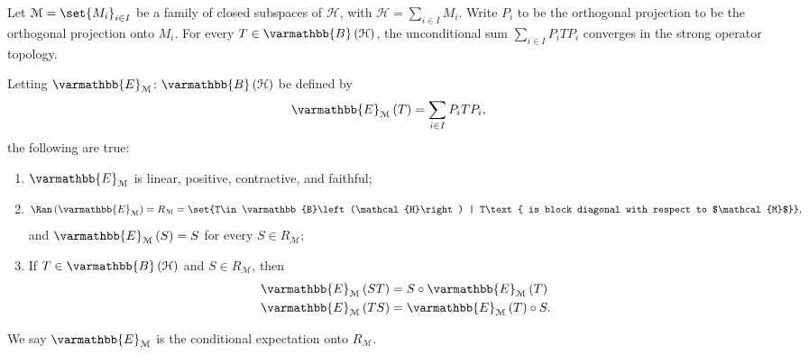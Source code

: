 \documentclass[10pt]{mypackage}
\renewcommand*{\mathbb}[1]{\varmathbb{#1}}
\newcommand{\B}{\mathbb{B}}
\begin{document}
\begin{proposition}
  Let $\mathcal{M} = \set{M_i}_{i\in I}$ be a family of closed subspaces of $\mathcal{H}$, with $\mathcal{H} = \sum_{i\in I}M_i$. Write $P_i$ to be the orthogonal projection to be the orthogonal projection onto $M_i$. For every $T\in \B\left(\mathcal{H}\right)$, the unconditional sum $\sum_{i\in I}P_iTP_i$ converges in the strong operator topology.\newline

  Letting $\mathbb{E}_{\mathcal{M}}\colon \B\left(\mathcal{H}\right)$ be defined by
  \begin{align*}
    \mathbb{E}_{\mathcal{M}}\left(T\right) &= \sum_{i\in I}P_iTP_i,
  \end{align*}
  the following are true:
  \begin{enumerate}[(1)]
    \item $\mathbb{E}_{\mathcal{M}}$ is linear, positive, contractive, and faithful;
    \item 
      \begin{align*}
        \Ran\left(\mathbb{E}_{\mathcal{M}}\right) = R_{\mathcal{M}} = \set{T\in \B\left(\mathcal{H}\right) | T\text{ is block diagonal with respect to $\mathcal{M}$}},
      \end{align*}
      and $\mathbb{E}_{\mathcal{M}}\left(S\right) = S$ for every $S\in R_{\mathcal{M}}$;
    \item If $T\in \B\left(\mathcal{H}\right)$ and $S\in R_{\mathcal{M}}$, then
      \begin{align*}
        \mathbb{E}_{\mathcal{M}}\left(ST\right) &= S\circ \mathbb{E}_{\mathcal{M}}\left(T\right)\\
        \mathbb{E}_{\mathcal{M}}\left(TS\right) &= \mathbb{E}_{\mathcal{M}}\left(T\right) \circ S.
      \end{align*}
  \end{enumerate}
  We say $\mathbb{E}_{\mathcal{M}}$ is the conditional expectation onto $R_{\mathcal{M}}$.
\end{proposition}
\end{document}

